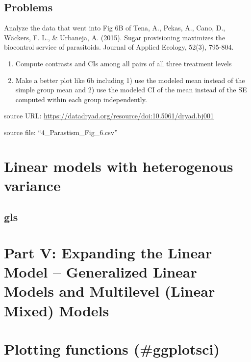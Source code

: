 \documentclass[]{book}
\providecommand{\tightlist}{%
  \setlength{\itemsep}{0pt}\setlength{\parskip}{0pt}}
\begin{document}
\hypertarget{problems-1}{%
\section{Problems}\label{problems-1}}

Analyze the data that went into Fig 6B of Tena, A., Pekas, A., Cano, D., Wäckers, F. L., \& Urbaneja, A. (2015). Sugar provisioning maximizes the biocontrol service of parasitoids. Journal of Applied Ecology, 52(3), 795-804.

\begin{enumerate}
\def\labelenumi{\arabic{enumi}.}
\tightlist
\item
  Compute contrasts and CIs among all pairs of all three treatment levels
\item
  Make a better plot like 6b including 1) use the modeled mean instead of the simple group mean and 2) use the modeled CI of the mean instead of the SE computed within each group independently.
\end{enumerate}

source URL: \url{https://datadryad.org/resource/doi:10.5061/dryad.bj001}

source file: ``4\_Parastism\_Fig\_6.csv''

\hypertarget{linear-models-with-heterogenous-variance}{%
\chapter{Linear models with heterogenous variance}\label{linear-models-with-heterogenous-variance}}

\hypertarget{gls}{%
\section{gls}\label{gls}}

\hypertarget{part-v-expanding-the-linear-model-generalized-linear-models-and-multilevel-linear-mixed-models}{%
\chapter*{Part V: Expanding the Linear Model -- Generalized Linear Models and Multilevel (Linear Mixed) Models}\label{part-v-expanding-the-linear-model-generalized-linear-models-and-multilevel-linear-mixed-models}}

\hypertarget{plotting-functions-ggplotsci}{%
\chapter{Plotting functions (\#ggplotsci)}\label{plotting-functions-ggplotsci}}
\end{document}
